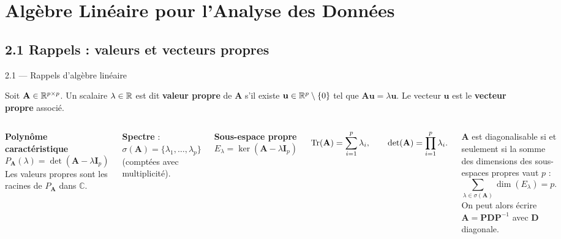 \section{Algèbre Linéaire pour l'Analyse des Données}

\subsection{2.1 Rappels : valeurs et vecteurs propres}
\begin{frame}{2.1 — Rappels d'algèbre linéaire}
\begin{definition}
Soit $\mathbf{A} \in \mathbb{R}^{p \times p}$. Un scalaire $\lambda \in \mathbb{R}$ est dit
\textbf{valeur propre} de $\mathbf{A}$ s'il existe $\mathbf{u} \in \mathbb{R}^p \setminus \{0\}$
tel que $\mathbf{A}\mathbf{u} = \lambda \mathbf{u}$. Le vecteur $\mathbf{u}$ est
le \textbf{vecteur propre} associé.
\end{definition}

\begin{columns}[T]
\textbf{Polynôme caractéristique}
\[
P_{\mathbf{A}}(\lambda) = \det(\mathbf{A} - \lambda \mathbf{I}_p)
\]
Les valeurs propres sont les racines de $P_{\mathbf{A}}$ dans $\mathbb{C}$.
\vspace{0.2cm}

\textbf{Spectre} : $\sigma(\mathbf{A}) = \{\lambda_1, \ldots, \lambda_p\}$
(comptées avec multiplicité).

\textbf{Sous-espace propre}
\[
E_\lambda = \ker(\mathbf{A} - \lambda \mathbf{I}_p)
\]

\begin{prop}
\[
\operatorname{Tr}(\mathbf{A}) = \sum_{i=1}^p \lambda_i, \qquad
\det(\mathbf{A}) = \prod_{i=1}^p \lambda_i.
\]
\end{prop}

\begin{prop}[Diagonalisation]
$\mathbf{A}$ est \alert{diagonalisable} si et seulement si la somme des
dimensions des sous-espaces propres vaut $p$ :
\[
\sum_{\lambda \in \sigma(\mathbf{A})} \dim(E_\lambda) = p.
\]
On peut alors écrire $\mathbf{A} = \mathbf{P}\mathbf{D}\mathbf{P}^{-1}$
avec $\mathbf{D}$ diagonale.
\end{prop}
\end{columns}
\end{frame}

